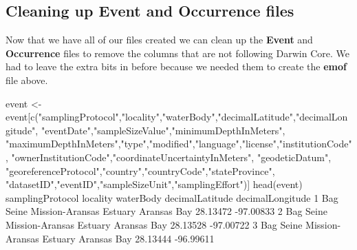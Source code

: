 \documentclass[
]{book}
\newenvironment{Shaded}{\begin{snugshade}}{\end{snugshade}}
\newcommand{\DecValTok}[1]{\textcolor[rgb]{0.00,0.00,0.81}{#1}}
\newcommand{\FloatTok}[1]{\textcolor[rgb]{0.00,0.00,0.81}{#1}}
\newcommand{\FunctionTok}[1]{\textcolor[rgb]{0.00,0.00,0.00}{#1}}
\newcommand{\NormalTok}[1]{#1}
\newcommand{\OtherTok}[1]{\textcolor[rgb]{0.56,0.35,0.01}{#1}}
\newcommand{\SpecialCharTok}[1]{\textcolor[rgb]{0.00,0.00,0.00}{#1}}
\newcommand{\StringTok}[1]{\textcolor[rgb]{0.31,0.60,0.02}{#1}}
\begin{document}
\hypertarget{cleaning-up-event-and-occurrence-files}{%
\subsection{Cleaning up Event and Occurrence files}\label{cleaning-up-event-and-occurrence-files}}

Now that we have all of our files created we can clean up the \textbf{Event} and \textbf{Occurrence} files to remove the columns that are not following Darwin Core. We had to leave the extra bits in before because we needed them to create the \textbf{emof} file above.

\begin{Shaded}
\begin{Highlighting}[]
\NormalTok{event }\OtherTok{\textless{}{-}}\NormalTok{ event[}\FunctionTok{c}\NormalTok{(}\StringTok{"samplingProtocol"}\NormalTok{,}\StringTok{"locality"}\NormalTok{,}\StringTok{"waterBody"}\NormalTok{,}\StringTok{"decimalLatitude"}\NormalTok{,}\StringTok{"decimalLongitude"}\NormalTok{,}
                 \StringTok{"eventDate"}\NormalTok{,}\StringTok{"sampleSizeValue"}\NormalTok{,}\StringTok{"minimumDepthInMeters"}\NormalTok{,}
                 \StringTok{"maximumDepthInMeters"}\NormalTok{,}\StringTok{"type"}\NormalTok{,}\StringTok{"modified"}\NormalTok{,}\StringTok{"language"}\NormalTok{,}\StringTok{"license"}\NormalTok{,}\StringTok{"institutionCode"}\NormalTok{,}
                 \StringTok{"ownerInstitutionCode"}\NormalTok{,}\StringTok{"coordinateUncertaintyInMeters"}\NormalTok{,}
                 \StringTok{"geodeticDatum"}\NormalTok{, }\StringTok{"georeferenceProtocol"}\NormalTok{,}\StringTok{"country"}\NormalTok{,}\StringTok{"countryCode"}\NormalTok{,}\StringTok{"stateProvince"}\NormalTok{,}
                 \StringTok{"datasetID"}\NormalTok{,}\StringTok{"eventID"}\NormalTok{,}\StringTok{"sampleSizeUnit"}\NormalTok{,}\StringTok{"samplingEffort"}\NormalTok{)]}
\FunctionTok{head}\NormalTok{(event)}
\NormalTok{  samplingProtocol                locality   waterBody decimalLatitude decimalLongitude}
\DecValTok{1}\NormalTok{        Bag Seine Mission}\SpecialCharTok{{-}}\NormalTok{Aransas Estuary Aransas Bay        }\FloatTok{28.13472}        \SpecialCharTok{{-}}\FloatTok{97.00833}
\DecValTok{2}\NormalTok{        Bag Seine Mission}\SpecialCharTok{{-}}\NormalTok{Aransas Estuary Aransas Bay        }\FloatTok{28.13528}        \SpecialCharTok{{-}}\FloatTok{97.00722}
\DecValTok{3}\NormalTok{        Bag Seine Mission}\SpecialCharTok{{-}}\NormalTok{Aransas Estuary Aransas Bay        }\FloatTok{28.13444}        \SpecialCharTok{{-}}\FloatTok{96.99611}

\end{Highlighting}
\end{Shaded}
\end{document}
